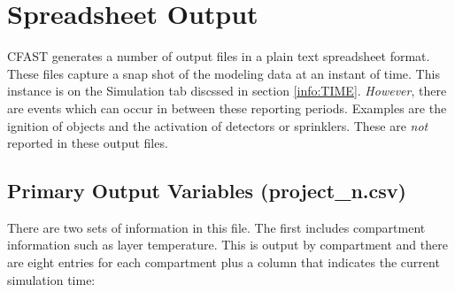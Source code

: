 \section{Spreadsheet Output}

CFAST generates a number of output files in a plain text spreadsheet format.  These files capture a snap shot of the modeling data at an instant of time. This instance is on the Simulation tab discssed in section \ref{info:TIME}. \emph{However}, there are events which can occur in between these reporting periods. Examples are the ignition of objects and the activation of detectors or sprinklers. These are \emph{not} reported in these output files.

\subsection{Primary Output Variables (project\_n.csv)}

There are two sets of information in this file. The first includes compartment information such as layer temperature. This is output by compartment and there are eight entries for each compartment plus a column that indicates the current simulation time:

